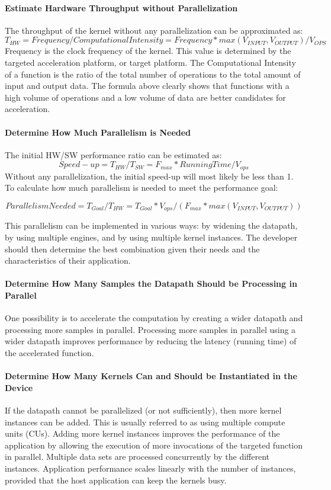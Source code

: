 \paragraph{Estimate Hardware Throughput without Parallelization}
The throughput of the kernel without any parallelization can be approximated as:
\[ T_{HW} = Frequency / Computational Intensity = Frequency * max(V_{INPUT},V_{OUTPUT}) / V_{OPS} \]
Frequency is the clock frequency of the kernel. This value is determined by the targeted acceleration platform, or target platform. The Computational Intensity of a function is the ratio of the total number of operations to the total amount of input and output data. The formula above clearly shows that functions with a high volume of operations and a low volume of data are better candidates for acceleration.

\paragraph{Determine How Much Parallelism is Needed}
The initial HW/SW performance ratio can be estimated as:
\[Speed-up = T_{HW}/T_{SW} = F_{max} * Running Time /V_{ops} \]
Without any parallelization, the initial speed-up will most likely be less than 1. To calculate how much parallelism is needed to meet the performance goal:

\[ Parallelism Needed = T_{Goal} / T_{HW} = T_{Goal} * V_{ops} / (F_{max} * max(V_{INPUT}, V_{OUTPUT})) \]

This parallelism can be implemented in various ways: by widening the datapath, by using multiple engines, and by using multiple kernel instances. The developer should then determine the best combination given their needs and the characteristics of their application.

\paragraph{Determine How Many Samples the Datapath Should be Processing
in Parallel}
One possibility is to accelerate the computation by creating a wider datapath and processing more samples in parallel. Processing more samples in parallel using a wider datapath improves performance by reducing the latency (running time) of the accelerated function.

\paragraph{Determine How Many Kernels Can and Should be Instantiated in the
Device}
If the datapath cannot be parallelized (or not sufficiently), then more kernel instances can be added. This is usually referred to as using multiple compute units (CUs). Adding more kernel instances improves the performance of the application by allowing the execution of more invocations of the targeted function in parallel. Multiple data sets are processed concurrently by the different instances. Application performance scales linearly with the number of instances, provided that the host application can keep the kernels busy.

